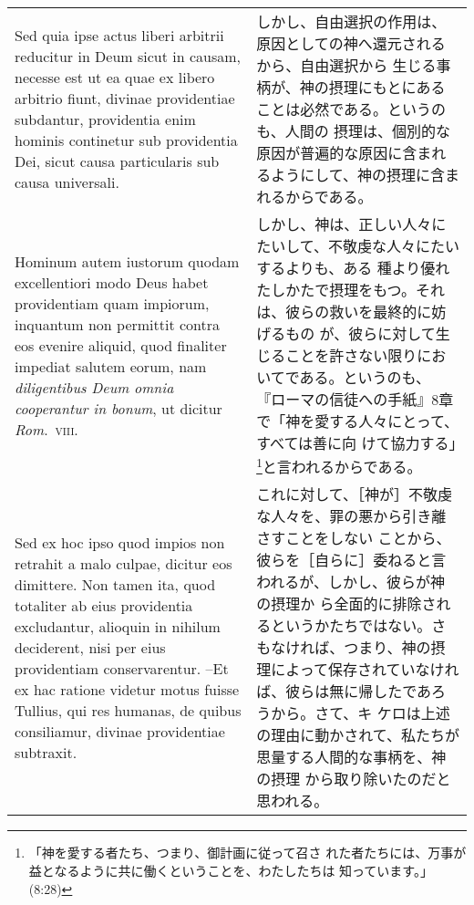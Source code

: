 \documentclass[10pt]{jsarticle} %
\begin{document}
\begin{longtable}{p{21em}p{21em}}
\\


Sed quia ipse actus
liberi arbitrii reducitur in Deum sicut in causam, necesse est ut ea
quae ex libero arbitrio fiunt, divinae providentiae subdantur,
providentia enim hominis continetur sub providentia Dei, sicut causa
particularis sub causa universali. 

&

しかし、自由選択の作用は、原因としての神へ還元されるから、自由選択から
生じる事柄が、神の摂理にもとにあることは必然である。というのも、人間の
摂理は、個別的な原因が普遍的な原因に含まれるようにして、神の摂理に含ま
れるからである。



\\



Hominum autem iustorum quodam
excellentiori modo Deus habet providentiam quam impiorum, inquantum non
permittit contra eos evenire aliquid, quod finaliter impediat salutem
eorum, nam {\itshape diligentibus Deum omnia cooperantur in bonum}, ut dicitur
{\itshape Rom}.~{\scshape viii}. 

&

しかし、神は、正しい人々にたいして、不敬虔な人々にたいするよりも、ある
種より優れたしかたで摂理をもつ。それは、彼らの救いを最終的に妨げるもの
が、彼らに対して生じることを許さない限りにおいてである。というのも、
『ローマの信徒への手紙』8章で「神を愛する人々にとって、すべては善に向
けて協力する」\footnote{「神を愛する者たち、つまり、御計画に従って召さ
れた者たちには、万事が益となるように共に働くということを、わたしたちは
知っています。」(8:28)}と言われるからである。

\\


Sed ex hoc ipso quod impios non retrahit a malo culpae,
dicitur eos dimittere. 
Non tamen ita, quod totaliter ab eius providentia
excludantur, alioquin in nihilum deciderent, nisi per eius providentiam
conservarentur. --Et ex hac ratione videtur motus fuisse Tullius, qui res
humanas, de quibus consiliamur, divinae providentiae subtraxit.


&

これに対して、［神が］不敬虔な人々を、罪の悪から引き離さすことをしない
ことから、彼らを［自らに］委ねると言われるが、しかし、彼らが神の摂理か
ら全面的に排除されるというかたちではない。さもなければ、つまり、神の摂
理によって保存されていなければ、彼らは無に帰したであろうから。さて、キ
ケロは上述の理由に動かされて、私たちが思量する人間的な事柄を、神の摂理
から取り除いたのだと思われる。



\end{longtable}
\end{document}
